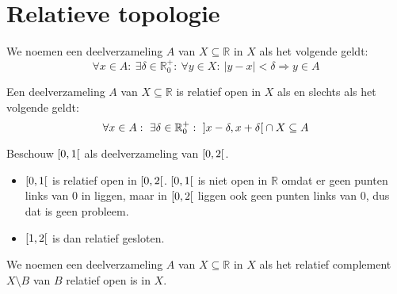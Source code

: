 \documentclass[main.tex]{subfiles}
\begin{document}
\section{Relatieve topologie}
\label{sec:relatieve-topologie}

\begin{de}
  We noemen een deelverzameling $A$ van $X\subseteq \mathbb{R}$  in $X$ als het volgende geldt:
  \[ \forall x\in A:\ \exists \delta \in \mathbb{R}_{0}^{+}:\ \forall y\in X:\ |y-x| < \delta \Rightarrow y \in A \]
\end{de}

\begin{st}
  Een  deelverzameling $A$ van $X\subseteq \mathbb{R}$  is relatief open in $X$ als en slechts als het volgende geldt:
  \[ \forall x\in A:\ \exists \delta\in \mathbb{R}_{0}^{+}:\ \interval[open]{x-\delta}{x+\delta} \cap X \subseteq A \]
\end{st}

\begin{vb}
  Beschouw $\interval[open right]{0}{1}$ als deelverzameling van $\interval[open right]{0}{2}$.
  \begin{itemize}
  \item $\interval[open right]{0}{1}$ is relatief open in $\interval[open right]{0}{2}$.
    $\interval[open right]{0}{1}$ is niet open in $\mathbb{R}$ omdat er geen punten links van $0$ in liggen, maar in $\interval[open right]{0}{2}$ liggen ook geen punten links van $0$, dus dat is geen probleem.
  \item $\interval[open right]{1}{2}$ is dan relatief gesloten.
  \end{itemize}
\end{vb}

\begin{de}
  We noemen een deelverzameling $A$ van $X\subseteq \mathbb{R}$  in $X$ als het relatief complement $X\setminus B$ van $B$ relatief open is in $X$.
\end{de}
\end{document}
